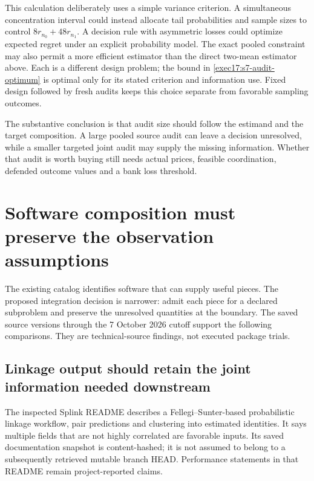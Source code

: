 This calculation deliberately uses a simple variance criterion. A simultaneous
concentration interval could instead allocate tail probabilities and sample
sizes to control $8r_{n_0}+48r_{n_1}$. A decision rule with asymmetric losses
could optimize expected regret under an explicit probability model. The exact
pooled constraint may also permit a more efficient estimator than the direct
two-mean estimator above. Each is a different design problem; the bound in
\eqref{exec17:s7-audit-optimum} is optimal only for its stated criterion and
information use. Fixed design followed by fresh audits keeps this choice
separate from favorable sampling outcomes.

The substantive conclusion is that audit size should follow the estimand and
the target composition. A large pooled source audit can leave a decision
unresolved, while a smaller targeted joint audit may supply the missing
information. Whether that audit is worth buying still needs actual prices,
feasible coordination, defended outcome values and a bank loss threshold.

\section{Software composition must preserve the observation assumptions}
\label{exec17:s7-software}

The existing catalog identifies software that can supply useful pieces.
The proposed integration decision is narrower: admit each piece for a
declared subproblem and preserve the unresolved quantities at the boundary.
The saved source versions through the 7 October 2026 cutoff support the
following comparisons. They are technical-source findings, not executed
package trials.~\citep{exec17_s7_paths}

\subsection{Linkage output should retain the joint information needed downstream}

The inspected Splink README describes a Fellegi--Sunter-based probabilistic
linkage workflow, pair predictions and clustering into estimated identities.
It says multiple fields that are not highly correlated are favorable inputs.
Its saved documentation snapshot is content-hashed; it is not assumed to
belong to a subsequently retrieved mutable branch HEAD. Performance statements
in that README remain project-reported claims.~\citep{sw_splink}

